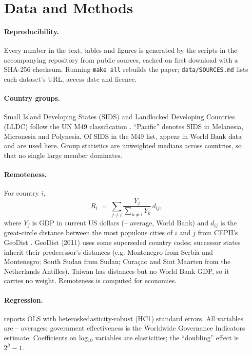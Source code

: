 \section{Data and Methods}
\label{app:data}

\paragraph{Reproducibility.} Every number in the text, tables and figures is
generated by the scripts in the accompanying repository from public sources,
cached on first download with a SHA-256 checksum. Running \texttt{make all}
rebuilds the paper; \texttt{data/SOURCES.md} lists each dataset's URL, access
date and licence.

\paragraph{Country groups.} Small Island Developing States (SIDS) and
Landlocked Developing Countries (LLDC) follow the UN M49 classification
\parencite{unm49}. \enquote{Pacific} denotes SIDS in Melanesia, Micronesia and
Polynesia. Of \nSIDSunList{} SIDS in the M49 list, \nSIDS{} appear in World Bank
data and are used here. Group statistics are unweighted medians across
countries, so that no single large member dominates.

\paragraph{Remoteness.} For country $i$,
\begin{equation}
  R_i \;=\; \sum_{j\neq i} \frac{Y_j}{\sum_{k\neq i} Y_k}\, d_{ij},
\end{equation}
where $Y_j$ is GDP in current US dollars (\windowStart--\windowEnd{}
average, World Bank) and $d_{ij}$ is the great-circle distance between the
most populous cities of $i$ and $j$ from CEPII's GeoDist \parencite{mayer2011}.
GeoDist (2011) uses some superseded country codes; successor states inherit
their predecessor's distances (e.g. Montenegro from Serbia and Montenegro;
South Sudan from Sudan; Curaçao and Sint Maarten from the Netherlands
Antilles). Taiwan has distances but no World Bank GDP, so it carries no
weight. Remoteness is computed for \nCountriesRemote{} economies.

\paragraph{Regression.}  reports OLS with
heteroskedasticity-robust (HC1) standard errors. All variables are
\windowStart--\windowEnd{} averages; government effectiveness is the
Worldwide Governance Indicators estimate. Coefficients on log$_{10}$ variables
are elasticities; the \enquote{doubling} effect is $2^{\beta}-1$.

